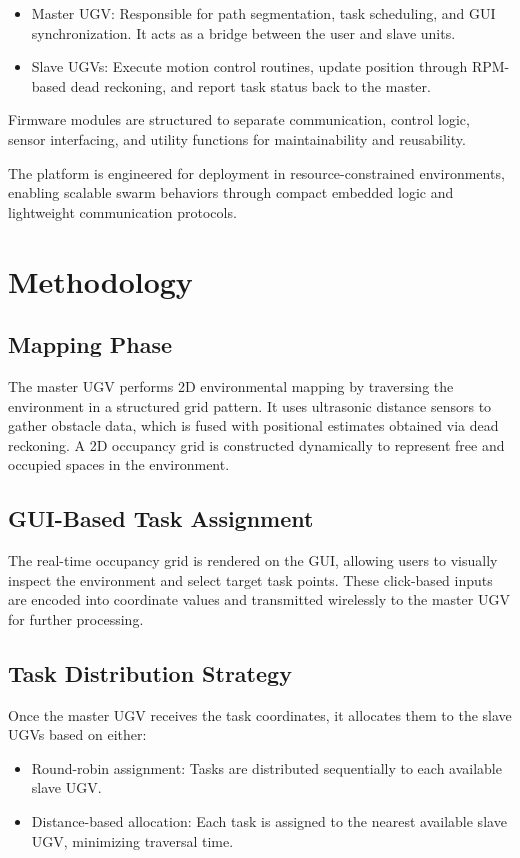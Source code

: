 \documentclass[conference]{IEEEtran}
\begin{document}
\begin{itemize}
    \item {Master UGV:} Responsible for path segmentation, task scheduling, and GUI synchronization. It acts as a bridge between the user and slave units.
    \item{Slave UGVs:} Execute motion control routines, update position through RPM-based dead reckoning, and report task status back to the master.
\end{itemize}

Firmware modules are structured to separate communication, control logic, sensor interfacing, and utility functions for maintainability and reusability.

The platform is engineered for deployment in resource-constrained environments, enabling scalable swarm behaviors through compact embedded logic and lightweight communication protocols.

\section{Methodology}
\label{sec:Methodology}
\subsection{Mapping Phase}
The master UGV performs 2D environmental mapping by traversing the environment in a structured grid pattern. It uses ultrasonic distance sensors to gather obstacle data, which is fused with positional estimates obtained via dead reckoning. A 2D occupancy grid is constructed dynamically to represent free and occupied spaces in the environment.

\subsection{GUI-Based Task Assignment}
The real-time occupancy grid is rendered on the GUI, allowing users to visually inspect the environment and select target task points. These click-based inputs are encoded into coordinate values and transmitted wirelessly to the master UGV for further processing.

\subsection{Task Distribution Strategy}
Once the master UGV receives the task coordinates, it allocates them to the slave UGVs based on either:

\begin{itemize}
    \item {Round-robin assignment}: Tasks are distributed sequentially to each available slave UGV.
    \item {Distance-based allocation}: Each task is assigned to the nearest available slave UGV, minimizing traversal time.
\end{itemize}
\end{document}
